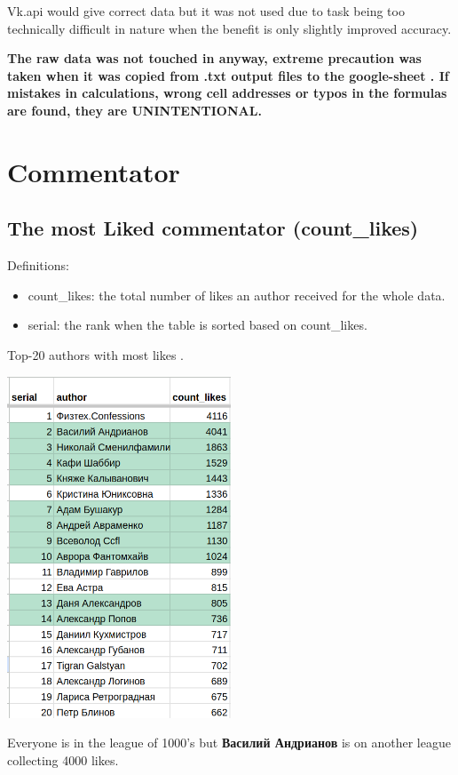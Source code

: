 \documentclass[
	12pt
] {article}
\begin{document}
	Vk.api would give correct data but it was not used due to task being too technically difficult in nature when the benefit is only slightly improved accuracy.
	
	\textbf{The raw data was not touched in anyway, extreme precaution was taken when it was copied from .txt output files to the google-sheet \cite{sheet-main}. If mistakes in calculations, wrong cell addresses or typos in the formulas are found, they are UNINTENTIONAL.}

\newpage
\section{Commentator}
\subsection{The most Liked commentator (count\_likes)}
	Definitions:
	\begin{itemize}
		\item count\_likes: the total number of likes an author received for the whole data.
		\item serial: the rank when the table is sorted based on count\_likes.
	\end{itemize}

	\begin{table}[H]
		\centering
		\caption{Top-20 authors with most likes \cite{sheet-count-likes}.}
		\label{table-count-likes}
		\includegraphics[width=0.5\textwidth]{table-count-likes-488}
	\end{table}

	Everyone is in the league of 1000's but \textbf{Василий Андрианов} is on another league collecting \num{4000} likes.
\end{document}
